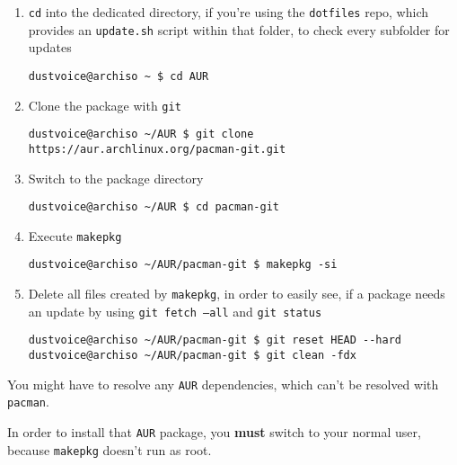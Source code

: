 \documentclass[9pt]{report}
\newenvironment{NOTE}
{\begin{tcolorbox}[colback=admonitionBG,coltitle=draculaFG,colframe=draculaBlue,colbacktitle=draculaBlue,title=NOTE]}
{\end{tcolorbox}}
\newenvironment{WARNING}
{\begin{tcolorbox}[colback=admonitionBG,coltitle=draculaBG,colframe=draculaOrange,colbacktitle=draculaOrange,title=WARNING]}
{\end{tcolorbox}}
\begin{document}
\begin{enumerate}

    \item{\texttt{cd} into the dedicated directory, if you’re using the \texttt{dotfiles} repo, which provides an \texttt{update.sh} script within that folder, to check every subfolder for updates}

        \begin{verbatim}
dustvoice@archiso ~ $ cd AUR
        \end{verbatim}
    \item{Clone the package with \texttt{git}}

        \begin{verbatim}
dustvoice@archiso ~/AUR $ git clone https://aur.archlinux.org/pacman-git.git
        \end{verbatim}
    \item{Switch to the package directory}

        \begin{verbatim}
dustvoice@archiso ~/AUR $ cd pacman-git
        \end{verbatim}
    \item{Execute \texttt{makepkg}}

        \begin{verbatim}
dustvoice@archiso ~/AUR/pacman-git $ makepkg -si
        \end{verbatim}
    \item{Delete all files created by \texttt{makepkg}, in order to easily see, if a package needs an update by using \texttt{git fetch --all} and \texttt{git status}}

        \begin{verbatim}
dustvoice@archiso ~/AUR/pacman-git $ git reset HEAD --hard
dustvoice@archiso ~/AUR/pacman-git $ git clean -fdx
        \end{verbatim}
\end{enumerate}


\begin{NOTE}
    You might have to resolve any \texttt{AUR} dependencies, which can’t be resolved with \texttt{pacman}.
\end{NOTE}

\begin{WARNING}
    In order to install that \texttt{AUR} package, you \textbf{must} switch to your normal user, because \texttt{makepkg} doesn’t run as root.
\end{WARNING}
\end{document}
